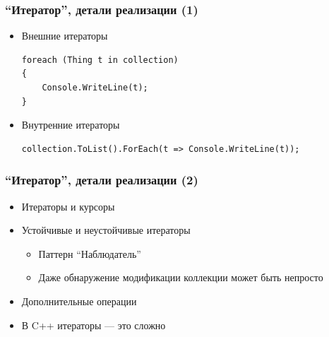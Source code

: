 \documentclass[xetex,mathserif,serif]{beamer}
\begin{document}
	\begin{frame}[fragile]
		\frametitle{``Итератор'', детали реализации (1)}
		\begin{itemize}
			\item Внешние итераторы
			\begin{verbatim}
foreach (Thing t in collection)
{
    Console.WriteLine(t);
} 
			\end{verbatim}
			\item Внутренние итераторы
			\begin{verbatim}
collection.ToList().ForEach(t => Console.WriteLine(t));
			\end{verbatim}
		\end{itemize}
	\end{frame}

	\begin{frame}
		\frametitle{``Итератор'', детали реализации (2)}
		\begin{itemize}
			\item Итераторы и курсоры
			\item Устойчивые и неустойчивые итераторы
			\begin{itemize}
				\item Паттерн ``Наблюдатель''
				\item Даже обнаружение модификации коллекции может быть непросто
			\end{itemize}
			\item Дополнительные операции
			\item В C++ итераторы --- это сложно
		\end{itemize}
	\end{frame}
\end{document}
